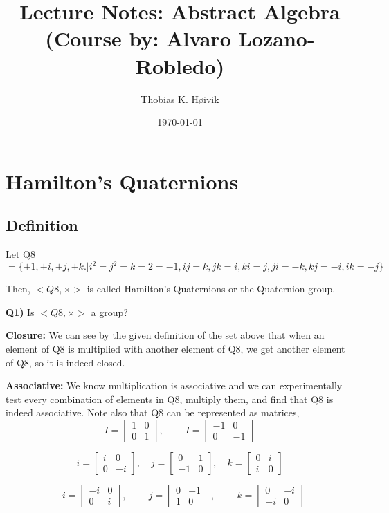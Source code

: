 \documentclass[12pt]{article}
\title{Lecture Notes: Abstract Algebra (Course by: Alvaro Lozano-Robledo)}
\author{Thobias K. Høivik}
\date{\today}
\begin{document}
\maketitle

\section*{Hamilton's Quaternions}

\subsection*{Definition}
Let Q8 
\[ 
  = \{\pm1, \pm i, \pm j, \pm k. | i^2 = j^2 = k=2 = -1, 
  ij = k, jk = i, ki = j, ji = -k, kj = -i, ik = -j\}
\]

\noindent
Then, \(<Q8, \times>\) is called Hamilton's Quaternions or the Quaternion group.

\noindent
\textbf{Q1)} Is \(<Q8, \times>\) a group?

\noindent 
\textbf{Closure:} We can see by the given definition of the set above that 
when an element of Q8 is multiplied with another element of Q8, we get another 
element of Q8, so it is indeed closed.

\noindent 
\textbf{Associative:} We know multiplication is associative and we can experimentally 
test every combination of elements in Q8, multiply them, and find that Q8 is indeed 
associative. Note also that Q8 can be represented as matrices, 
\[
I = \begin{bmatrix} 1 & 0 \\ 0 & 1 \end{bmatrix}, \quad
- I = \begin{bmatrix} -1 & 0 \\ 0 & -1 \end{bmatrix}
\]

\[
i = \begin{bmatrix} i & 0 \\ 0 & -i \end{bmatrix}, \quad
j = \begin{bmatrix} 0 & 1 \\ -1 & 0 \end{bmatrix}, \quad
k = \begin{bmatrix} 0 & i \\ i & 0 \end{bmatrix}
\]

\[
- i = \begin{bmatrix} -i & 0 \\ 0 & i \end{bmatrix}, \quad
- j = \begin{bmatrix} 0 & -1 \\ 1 & 0 \end{bmatrix}, \quad
- k = \begin{bmatrix} 0 & -i \\ -i & 0 \end{bmatrix}
\]
\end{document}
